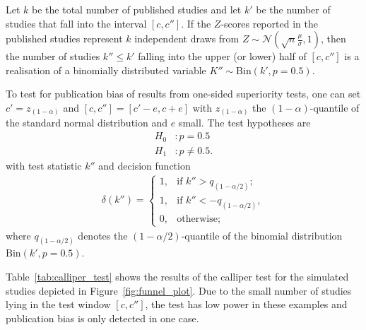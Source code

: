 Let $k$ be the total number of published studies and let $k'$ be the number of studies that fall into the interval $[c,c'']$. If the $Z$-scores reported in the published studies represent $k$ independent draws from $Z \sim \mathcal{N}(\sqrt{n}\frac{\mu}{\sigma},1)$, then the number of studies $k'' \leq k'$ falling into the upper (or lower) half of $[c, c'']$ is a realisation of a binomially distributed variable $K'' \sim \text{Bin}(k', p = 0.5)$. \par
To test for publication bias of results from one-sided superiority tests, one can set ${c' = z_{(1-\alpha)}}$ and ${[c,c''] = [c'-e, c+e]}$ with 
$z_{(1-\alpha)}$ the $(1-\alpha)$-quantile of the standard normal distribution and $e$ small. The test hypotheses are
\begin{align*}
    H_0 &: p = 0.5 \\
    H_1 &: p \neq 0.5.
\end{align*}
with test statistic $k''$ and decision function 
\begin{align*}
    \delta(k'') = \begin{cases} 1, & \text{if } k'' > q_{(1-\alpha/2)}; \\
    1, & \text{if } k'' < -q_{(1-\alpha/2)}, \\
    0, & \mbox{otherwise};\end{cases}
\end{align*}
where $q_{(1-\alpha/2)}$ denotes the ${(1-\alpha/2)}$-quantile of the binomial distribution ${\text{Bin}(k', p = 0.5)}$.\par
Table~\ref{tab:calliper_test} shows the results of the calliper test for the simulated studies depicted in Figure~\ref{fig:funnel_plot}. Due to the small number of studies lying in the test window $[c,c'']$, the test has low power in these examples and publication bias is only detected in one case.
